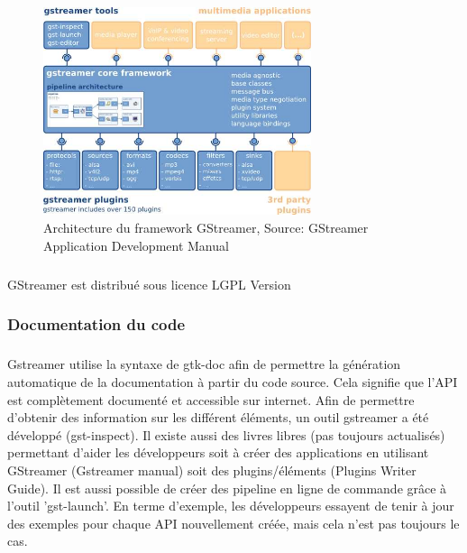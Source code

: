 \begin{figure}

  \begin{center}

    \includegraphics[width=0.70\textwidth]{images/gstoverview}

  \end{center}

  \caption{Architecture du framework GStreamer, Source: GStreamer
  Application Development Manual}

  \label{Yes}

\end{figure}

\subparagraph{}

GStreamer est distribué sous licence LGPL Version

\subsubsection{Documentation du code}

\subparagraph{} Gstreamer utilise la syntaxe de gtk-doc afin de
permettre la génération automatique de la documentation à partir du
code source. Cela signifie que l'API est complètement documenté et
accessible sur internet. Afin de permettre d'obtenir des information
sur les différent éléments, un outil gstreamer a été développé
(gst-inspect). Il existe aussi des livres libres (pas toujours
actualisés) permettant d'aider les développeurs soit à créer
des applications en utilisant GStreamer (Gstreamer manual) soit des
plugins/éléments (Plugins Writer Guide). Il est aussi possible de créer
des pipeline en ligne de commande grâce à l'outil 'gst-launch'. En terme
d'exemple, les développeurs essayent de tenir à jour des exemples pour
chaque API nouvellement créée, mais cela n'est pas toujours le cas.

